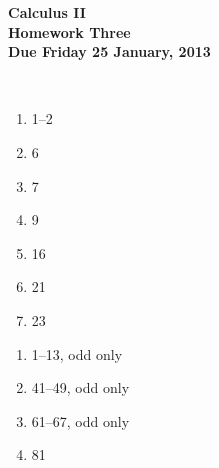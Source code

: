 \documentclass[12pt]{article}
\begin{document}
\pagestyle{empty}
 
\begin{center}
{\large {\bf Calculus II}}\\
\medskip
{\large {\bf Homework Three}}\\
\medskip
{ {\bf Due Friday 25 January, 2013}}\\
\end{center}

\hspace{2mm}\\



\begin{enumerate}
\setlength{\itemsep}{-1mm}
  \item 1--2
  \item 6
  \item 7
  \item 9
  \item 16
  \item 21 
  \item 23

\end{enumerate}


\begin{enumerate}
\setlength{\itemsep}{-1mm}
  \item 1--13, odd only
  \item 41--49, odd only
  \item 61--67, odd only
  \item 81
\end{enumerate}





\end{document}
